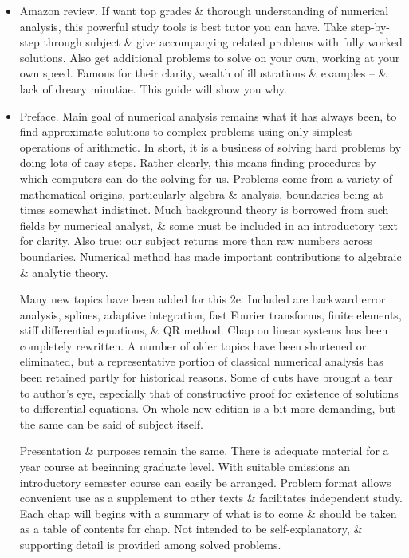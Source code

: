 \documentclass{article}
\begin{document}
\begin{itemize}
	\item {\sf Amazon review.} If want top grades \& thorough understanding of numerical analysis, this powerful study tools is best tutor you can have. Take step-by-step through subject \& give accompanying related problems with fully worked solutions. Also get additional problems to solve on your own, working at your own speed. Famous for their clarity, wealth of illustrations \& examples -- \& lack of dreary minutiae. This guide will show you why.
	\item {\sf Preface.} Main goal of numerical analysis remains what it has always been, to find approximate solutions to complex problems using only simplest operations of arithmetic. In short, it is a business of solving hard problems by doing lots of easy steps. Rather clearly, this means finding procedures by which computers can do the solving for us. Problems come from a variety of mathematical origins, particularly algebra \& analysis, boundaries being at times somewhat indistinct. Much background theory is borrowed from such fields by numerical analyst, \& some must be included in an introductory text for clarity. Also true: our subject returns more than raw numbers across boundaries. Numerical method has made important contributions to algebraic \& analytic theory.
	
	Many new topics have been added for this 2e. Included are backward error analysis, splines, adaptive integration, fast Fourier transforms, finite elements, stiff differential equations, \& QR method. Chap on linear systems has been completely rewritten. A number of older topics have been shortened or eliminated, but a representative portion of classical numerical analysis has been retained partly for historical reasons. Some of cuts have brought a tear to author's eye, especially that of constructive proof for existence of solutions to differential equations. On whole new edition is a bit more demanding, but the same can be said of subject itself.
	
	Presentation \& purposes remain the same. There is adequate material for a year course at beginning graduate level. With suitable omissions an introductory semester course can easily be arranged. Problem format allows convenient use as a supplement to other texts \& facilitates independent study. Each chap will begins with a summary of what is to come \& should be taken as a table of contents for chap. Not intended to be self-explanatory, \& supporting detail is provided among solved problems.
	

\end{itemize}
\end{document}

